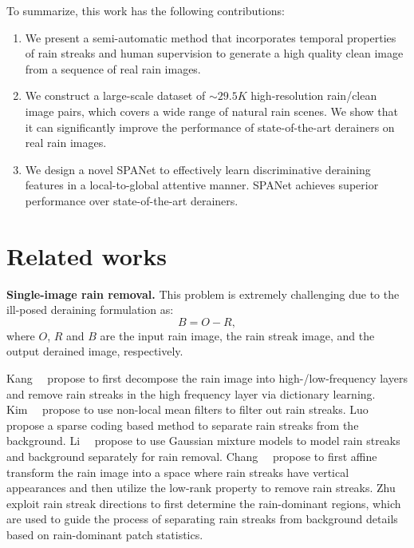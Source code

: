 \documentclass[10pt,twocolumn,letterpaper]{article}
\begin{document}
To summarize, this work has the following contributions:
\begin{enumerate}
	\item We present a semi-automatic method that incorporates temporal properties of rain streaks and human supervision to generate a high quality clean image from a sequence of real rain images.

	\item We construct a large-scale dataset of $\sim$$29.5K$ high-resolution rain/clean image pairs, which covers a wide range of natural rain scenes. We show that it can significantly improve the performance of state-of-the-art derainers on real rain images.

  \item We design a novel SPANet to effectively learn discriminative deraining features in a local-to-global attentive manner. SPANet achieves superior performance over state-of-the-art derainers.

\end{enumerate}



\section{Related works}

{\bf Single-image rain removal.} This problem is extremely challenging due to the ill-posed deraining formulation as:
\begin{equation}\label{rmod}
B = O - R,
\end{equation}
where $O$, $R$ and $B$ are the input rain image, the rain streak image, and the output derained image, respectively.

Kang~\etal~\cite{kang:tip:2012:imgdecomp} propose to first decompose the rain image into high-/low-frequency layers and remove rain streaks in the high frequency layer via dictionary learning.
Kim~\etal~\cite{kim:tip:2015:videoderain} propose to use non-local mean filters to filter out rain streaks.
Luo~\etal~\cite{luo:iccv:2015:dsc} propose a sparse coding based method to separate rain streaks from the background.
Li~\etal~\cite{li:cvpr:2016:lp} propose to use Gaussian mixture models to model rain streaks and background separately for rain removal.
Chang~\etal~\cite{chang:iccv:2017:lpnr} propose to first affine transform the rain image into a space where rain streaks have vertical appearances and then utilize the low-rank property to remove rain streaks.
Zhu~\etal~\cite{zhu:iccv:2017:jbo} exploit rain streak directions to first determine the rain-dominant regions, which are used to guide the process of separating rain streaks from background details based on rain-dominant patch statistics.
\end{document}
